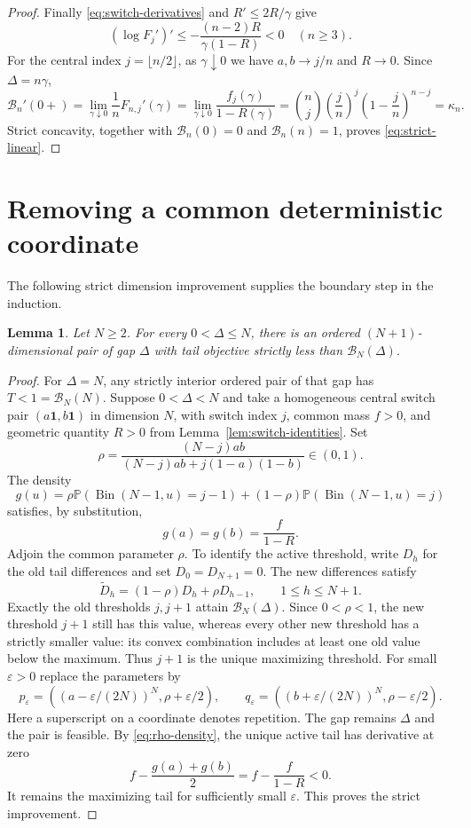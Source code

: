 \documentclass[11pt]{article}
\numberwithin{equation}{section}
\newtheorem{lemma}[theorem]{Lemma}
\theoremstyle{remark}\newtheorem{remark}[theorem]{Remark}
\DeclareMathOperator{\Bin}{Bin}
\newcommand{\PP}{\mathbb P}
\newcommand{\one}{\mathbf 1}
\newcommand{\Bcal}{\mathcal B}
\begin{document}
\begin{proof}
Finally \eqref{eq:switch-derivatives} and $R'\le2R/\gamma$ give
\[
 (\log F_j')'\le-\frac{(n-2)R}{\gamma(1-R)}<0\quad(n\ge3).
\]
For the central index $j=\lfloor n/2\rfloor$, as $\gamma\downarrow0$
we have $a,b\to j/n$ and $R\to0$. Since $\Delta=n\gamma$,
\[
 \Bcal_n'(0+)
 =\lim_{\gamma\downarrow0}\frac1n F_{n,j}'(\gamma)
 =\lim_{\gamma\downarrow0}\frac{f_j(\gamma)}{1-R(\gamma)}
 =\binom nj\left(\frac jn\right)^j
            \left(1-\frac jn\right)^{n-j}
 =\kappa_n.
\]
Strict concavity, together with $\Bcal_n(0)=0$ and $\Bcal_n(n)=1$,
proves \eqref{eq:strict-linear}.
\end{proof}

\section{Removing a common deterministic coordinate}
The following strict dimension improvement supplies the boundary step
in the induction.
\begin{lemma}\label{lem:dimension}
Let $N\ge2$. For every $0<\Delta\le N$, there is an ordered
$(N+1)$-dimensional pair of gap
$\Delta$ with tail objective strictly less than $\Bcal_N(\Delta)$.
\end{lemma}
\begin{proof}
For $\Delta=N$, any strictly interior ordered pair of that gap has
$T<1=\Bcal_N(N)$. Suppose $0<\Delta<N$ and take a homogeneous central
switch pair $(a\one,b\one)$ in dimension $N$, with switch index $j$,
common mass $f>0$, and geometric quantity $R>0$ from
Lemma~\ref{lem:switch-identities}. Set
\[
 \rho=\frac{(N-j)ab}{(N-j)ab+j(1-a)(1-b)}\in(0,1).
\]
The density
\[
 g(u)=\rho\PP(\Bin(N-1,u)=j-1)
       +(1-\rho)\PP(\Bin(N-1,u)=j)
\]
satisfies, by substitution,
\begin{equation}\label{eq:rho-density}
 g(a)=g(b)=\frac f{1-R}.
\end{equation}
Adjoin the common parameter $\rho$. To identify the active threshold,
write $D_h$ for the old tail differences and set $D_0=D_{N+1}=0$.
The new differences satisfy
\[
 \widetilde D_h=(1-\rho)D_h+\rho D_{h-1},\qquad 1\le h\le N+1.
\]
Exactly the old thresholds $j,j+1$ attain $\Bcal_N(\Delta)$.
Since $0<\rho<1$, the new threshold $j+1$ still has this value,
whereas every other new threshold has a strictly smaller value: its
convex combination includes at least one old value below the maximum.
Thus $j+1$ is the unique maximizing threshold.
For small $\varepsilon>0$ replace the parameters by
\[
 p_\varepsilon=
 \left((a-\varepsilon/(2N))^N,\rho+\varepsilon/2\right),\qquad
 q_\varepsilon=
 \left((b+\varepsilon/(2N))^N,\rho-\varepsilon/2\right).
\]
Here a superscript on a coordinate denotes repetition. The gap remains
$\Delta$ and the pair is feasible. By \eqref{eq:rho-density}, the unique
active tail has derivative at zero
\[
 f-\frac{g(a)+g(b)}2=f-\frac f{1-R}<0.
\]
It remains the maximizing tail for sufficiently small $\varepsilon$.
This proves the strict improvement.
\end{proof}
\end{document}
